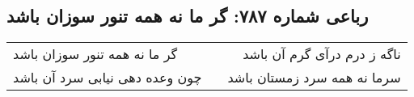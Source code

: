 \begin{center}
\section*{رباعی شماره ۷۸۷: گر ما نه همه تنور سوزان باشد}
\label{sec:0787}
\begin{longtable}{l p{0.5cm} r}
گر ما نه همه تنور سوزان باشد
&&
ناگه ز درم درآی گرم آن باشد
\\
چون وعده دهی نیابی سرد آن باشد
&&
سرما نه همه سرد زمستان باشد
\\
\end{longtable}
\end{center}
